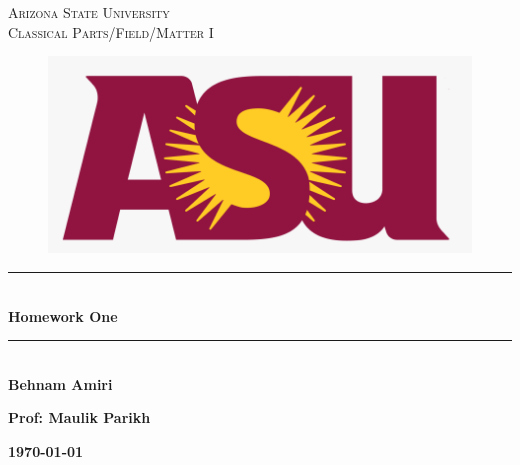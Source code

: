 \documentclass[fleqn]{article}
\begin{document}
  \begin{titlepage}

    \newcommand{\HRule}{\rule{\linewidth}{0.5mm}}

    \center



    \textsc{\LARGE Arizona State University}\\[1.5cm]

    \textsc{\LARGE Classical Parts/Field/Matter I }\\[1.5cm]


    \begin{figure}
      \includegraphics[width=\linewidth]{asu.png}
    \end{figure}


    \HRule \\[0.4cm]
    { \huge \bfseries Homework One}\\[0.4cm] 
    \HRule \\[1.5cm]

    \textbf{Behnam Amiri}

    \bigbreak

    \textbf{Prof: Maulik Parikh}

    \bigbreak


    \textbf{{\large \today}\\[2cm]}

    \vfill

  \end{titlepage}
\end{document}
